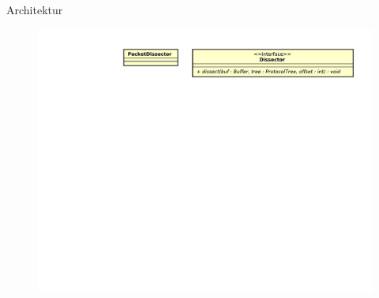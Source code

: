 \begin{frame}{Architektur}
    \begin{figure}
    	\centering
    	\includegraphics[width=\textwidth]{./images/dissector/2.pdf}
    \end{figure}
\end{frame}

